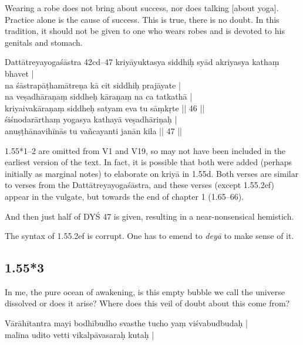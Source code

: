 \begin{ekdosis}
\begin{translation}[hp01_055_1]
Wearing a robe does not bring about success, nor does talking [about yoga]. Practice alone is the cause of success. This is true, there is no doubt. In this tradition, it should not be given to one who wears robes and is devoted to his genitals and stomach.
\end{translation}

\begin{sources}[hp01_055_1]
Dattātreyayogaśāstra 42cd--47
\startverse
kriyāyuktasya siddhiḥ syād akriyasya kathaṃ bhavet |\\
na śāstrapāṭhamātreṇa kā cit siddhiḥ prajāyate |\\
na veṣadhāraṇaṃ siddheḥ kāraṇaṃ na ca tatkathā |\\
kriyaivakāraṇaṃ siddheḥ satyam eva tu sāṃkṛte || 46 ||\\
śiśnodarārthaṃ yogasya kathayā veṣadhāriṇaḥ |\\
anuṣṭhānavihīnās tu vañcayanti janān kila || 47 ||
\endverse
\end{sources}

\begin{testimonia}[hp01_055_1]
\end{testimonia}

\begin{philcomm}[hp01_055_1]
1.55*1–2 are omitted from V1 and V19, so may not have been included in the earliest version of the text. In fact, it is possible that both were added (perhaps initially as marginal notes) to elaborate on kriyā in 1.55d. Both verses are similar to verses from the Dattātreyayogaśāstra, and these verses (except 1.55.2ef) appear in the vulgate, but towards the end of chapter 1 (1.65–66).

And then just half of DYŚ 47 is given, resulting in a near-nonsensical hemistich.

The syntax of 1.55.2ef is corrupt. One has to emend to \emph{deyā} to make sense of it.
\end{philcomm}

\subsection*{1.55*3}
\begin{translation}[hp01_055_3]
In me, the pure ocean of awakening, is this empty bubble we call the universe dissolved or does it arise? Where does this veil of doubt about this come from?
\end{translation}

\begin{testimonia}[hp01_055_3]
Vārāhītantra
\startverse
mayi bodhībudho svasthe tucho yaṃ viśvabudbudaḥ |\\
malīna udito vetti vikalpāvasaraḥ kutaḥ |
\endverse


\end{testimonia}
\end{ekdosis}
